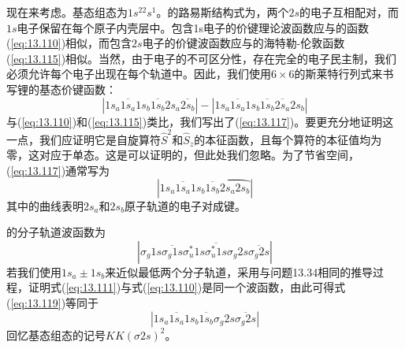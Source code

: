     现在来考虑。基态组态为$1s^22s^1$。的路易斯结构式为，两个$2s$的电子互相配对，而$1s$电子保留在每个原子内壳层中。包含1s电子的价键理论波函数应与的函数(\ref{eq:13.110})相似，而包含$2s$电子的价键波函数应与的海特勒-伦敦函数(\ref{eq:13.115})相似。当然，由于电子的不可区分性，存在完全的电子民主制，我们必须允许每个电子出现在每个轨道中。因此，我们使用$6\times 6$的斯莱特行列式来书写锂的基态价键函数：
    \begin{equation}
        \left| 1s_a\overline{1s_a}1s_b\overline{1s_b}2s_a\overline{2s_b} \right| - \left| 1s_a\overline{1s_a}1s_b\overline{1s_b}\overline{2s_a}2s_b \right|
        \label{eq:13.117}
    \end{equation}
    与(\ref{eq:13.110})和(\ref{eq:13.115})类比，我们写出了(\ref{eq:13.117})。要更充分地证明这一点，我们应证明它是自旋算符$\hat{S}^2$和$\hat{S}_z$的本征函数，且每个算符的本征值均为零，这对应于单态。这是可以证明的，但此处我们忽略。为了节省空间，(\ref{eq:13.117})通常写为
    \begin{equation}
        \left|1s_a \overline{1s_a} 1s_b \overline{1s_b} \wideparen{2s_a 2s_b} \right|
        \label{eq:13.118}
    \end{equation}
    其中的曲线表明$2s_a$和$2s_b$原子轨道的电子对成键。

    的分子轨道波函数为
    \begin{equation}
        \left| \sigma_g 1s \overline{\sigma_g 1s} \sigma_u^* 1s \overline{\sigma_u^* 1s} \sigma_g 2s \overline{\sigma_g 2s} \right|
        \label{eq:13.119}
    \end{equation}
    若我们使用$1s_a \pm 1s_b$来近似最低两个分子轨道，采用与问题13.34相同的推导过程，证明式(\ref{eq:13.111})与式(\ref{eq:13.110})是同一个波函数，由此可得式(\ref{eq:13.119})等同于
    \begin{equation*}
        \left| 1s_a \overline{1s_a} 1s_b \overline{1s_b} \sigma_g 2s \overline{\sigma_g 2s} \right|
    \end{equation*}
    回忆基态组态的记号$KK\left(\sigma 2s\right)^2$。

